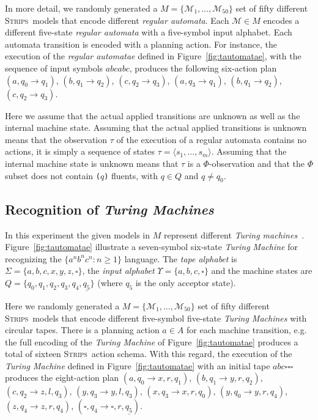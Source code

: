 \documentclass[letterpaper]{article} %
\newcommand{\tup}[1]{{\langle #1 \rangle}}
\newcommand{\strips}{\textsc{Strips}}     %
\begin{document}
In more detail, we randomly generated a $M=\{\mathcal{M}_1,\ldots,\mathcal{M}_{50}\}$ set of fifty different \strips\ models that encode different {\em regular automata}. Each $\mathcal{M}\in M$ encodes a different five-state {\em regular automata} with a five-symbol input alphabet. Each automata transition is encoded with a planning action. For instance, the execution of the {\em regular automatae} defined in Figure~\ref{fig:tautomatae}, with the sequence of input symbols $abcabc$, produces the following six-action plan {\small $(a,q_0\rightarrow q_1)$, $(b,q_1\rightarrow q_2)$, $(c,q_2\rightarrow q_3)$, $(a,q_3\rightarrow q_1)$, $(b,q_1\rightarrow q_2)$, $(c,q_2\rightarrow q_3)$}.

Here we assume that the actual applied transitions are unknown as well as the internal machine state. Assuming that the actual applied transitions is unknown means that the observation $\tau$ of the execution of a regular automata contains no actions, it is simply a sequence of states $\tau=\tup{s_1, \ldots , s_m}$. Assuming that the internal machine state is unknown means that $\tau$ is a $\Phi$-observation and that the $\Phi$ subset does not contain {\small\tt ($q$)} fluents, with $q\in Q$ and $q\neq q_0$. 

\subsection{Recognition of {\em Turing Machines}}
In this experiment the given models in $M$ represent different {\em Turing machines}~\cite{bylander1994computational,porco2013automatic}. Figure~\ref{fig:tautomatae} illustrate a seven-symbol six-state {\em Turing Machine} for recognizing the $\{a^nb^nc^n : n \geq 1 \}$ language. The {\em tape alphabet} is $\Sigma=\{a,b,c,x,y,z,\square\}$, the {\em input alphabet} $\Upsilon=\{a,b,c,\square\}$ and the machine states are $Q=\{q_0,q_1,q_2,q_3,q_4,\underline{q_5}\}$ (where \underline{$q_5$} is the only acceptor state).

Here we randomly generated a $M=\{\mathcal{M}_1,\ldots,\mathcal{M}_{50}\}$ set of fifty different \strips\ models that encode different five-symbol five-state {\em Turing Machines} with circular tapes. There is a planning action $a\in A$ for each machine transition, e.g. the full encoding of the {\em Turing Machine} of Figure~\ref{fig:tautomatae} produces a total of sixteen \strips\ action schema. With this regard, the execution of the {\em Turing Machine} defined in Figure~\ref{fig:tautomatae} with an initial tape $abc\square\square\square$ produces the eight-action plan {\small $(a,q_0\rightarrow x,r,q_1)$, $(b,q_1\rightarrow y,r,q_2)$, $(c,q_2\rightarrow z,l,q_3)$, $(y,q_3\rightarrow y,l,q_3)$, $(x,q_3\rightarrow x,r,q_0)$, $(y,q_0\rightarrow y,r,q_4)$, $(z,q_4\rightarrow z,r,q_4)$, $(\square,q_4\rightarrow \square,r,\underline{q_5})$}.
\end{document}
